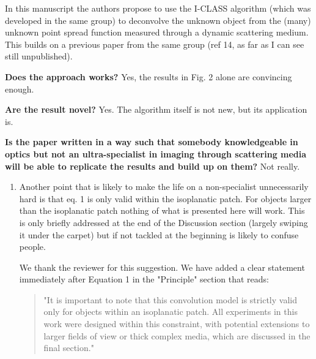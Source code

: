 \documentclass[12pt]{article}
\newenvironment{solved_reviewercomment}
    {\begin{tcolorbox}[width=\linewidth,colback=gray!5,colframe=solved_commentcolor!50,title=Reviewer Comment,left=5pt,right=5pt]}
    {\end{tcolorbox}}
\newenvironment{ourresponse}
    {\begin{tcolorbox}[width=\linewidth,breakable,enhanced,colback=gray!5,colframe=responsecolor!50,title=Response,left=5pt,right=5pt]}
    {\end{tcolorbox}}
\begin{document}
In this manuscript the authors propose to use the I-CLASS algorithm (which was developed in the same group) to deconvolve the unknown object from the (many) unknown point spread function measured through a dynamic scattering medium. This builds on a previous paper from the same group (ref 14, as far as I can see still unpublished).

\textbf{Does the approach works?} Yes, the results in Fig. 2 alone are convincing enough.

\textbf{Are the result novel?} Yes. The algorithm itself is not new, but its application is.

\textbf{Is the paper written in a way such that somebody knowledgeable in optics but not an ultra-specialist in imaging through scattering media will be able to replicate the results and build up on them?} Not really. 
\begin{enumerate}[label=\arabic*.]

    \begin{solved_reviewercomment}
        The main culprit is that the whole CRT-CLASS/I-CLASS are not well-known algorithms, and the only reference given to readers to make themselves familiar with them is not self-contained. \textbf{This has a very easy fix:} add a section in the supplementary information with an explanation of how and why the algorithm works (there is no space restriction there, so there is also no excuse to provide the necessary information).
    \end{solved_reviewercomment}
    \begin{ourresponse}
        It is the same comment as the first referee.
    \end{ourresponse}

    \item \leavevmode\vspace{-\baselineskip}
    \begin{solved_reviewercomment}
        Another point that is likely to make the life on a non-specialist unnecessarily hard is that eq. 1 is only valid within the isoplanatic patch. For objects larger than the isoplanatic patch nothing of what is presented here will work. This is only briefly addressed at the end of the Discussion section (largely swiping it under the carpet) but if not tackled at the beginning is likely to confuse people.
        
    \end{solved_reviewercomment}
    \begin{ourresponse}
        We thank the reviewer for this suggestion. 
        We have added a clear statement immediately after Equation 1 in the "Principle" section that reads:
        \begin{quote}
            "It is important to note that this convolution model is strictly valid only for objects within an isoplanatic patch. All experiments in this work were designed within this constraint, with potential extensions to larger fields of view or thick complex media, which are discussed in the final section."
        \end{quote}
        

\end{ourresponse}
\end{enumerate}
\end{document}
